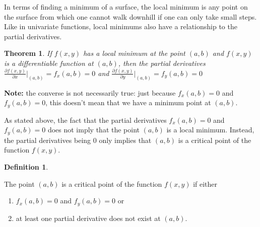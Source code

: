 \documentclass[
]{book}
\newtheorem{theorem}{Theorem}[chapter]
\theoremstyle{definition}
\newtheorem{definition}{Definition}[chapter]
\theoremstyle{definition}
\theoremstyle{definition}
\theoremstyle{remark}
\begin{document}
In terms of finding a minimum of a surface, the local minimum is any point on the surface from which one cannot walk downhill if one can only take small steps. Like in univariate functions, local minimums also have a relationship to the partial derivatives.

\begin{theorem}
\protect\hypertarget{thm:unnamed-chunk-301}{}{\label{thm:unnamed-chunk-301} }If \(f(x, y)\) has a local minimum at the point \((a, b)\) and \(f(x, y)\) is a differentiable function at \((a, b)\), then the partial derivatives \(\frac{\partial f(x, y)}{\partial x}|_{(a, b)} = f_x(a, b) = 0\) and \(\frac{\partial f(x, y)}{\partial y}|_{(a, b)} = f_y(a, b) = 0\)
\end{theorem}

\textbf{Note:} the converse is not necessarily true: just because \(f_x(a, b) = 0\) and \(f_y(a, b) = 0\), this doesn't mean that we have a minimum point at \((a, b)\).

As stated above, the fact that the partial derivatives \(f_x(a, b) = 0\) and \(f_y(a, b) = 0\) does not imply that the point \((a, b)\) is a local minimum. Instead, the partial derivatives being 0 only implies that \((a, b)\) is a critical point of the function \(f(x, y)\).

\begin{definition}
\protect\hypertarget{def:unlabeled-div-223}{}\label{def:unlabeled-div-223}

The point \((a, b)\) is a critical point of the function \(f(x, y)\) if either

\begin{enumerate}
\def\labelenumi{\alph{enumi})}
\item
  \(f_x(a, b) = 0\) and \(f_y(a, b) = 0\) or
\item
  at least one partial derivative does not exist at \((a, b)\).
\end{enumerate}

\end{definition}
\end{document}

